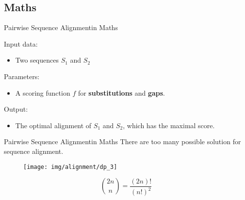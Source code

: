\documentclass[10pt]{beamer}
\newcommand{\1}{
	\setbeamertemplate{background}{
		\texttt{[image: img/1]}
		\tikz[overlay] \fill[fill opacity=0.75,fill=white] (0,0) rectangle (-\paperwidth,\paperheight);
	}
}
\begin{document}
\subsection{Maths}

\begin{frame}{Pairwise Sequence Alignment}{in Maths}		
	\begin{block}{}
	Input data:
			\begin{itemize}
				\item Two sequences $S_1$ and $S_2$
			\end{itemize}
	\end{block}

	\begin{block}{}
		Parameters:
			\begin{itemize}
				\item A scoring function $f$ for \textbf{substitutions} and \textbf{gaps}.
			\end{itemize}
	\end{block}

 	\begin{block}{}
 		Output:
			\begin{itemize}
				\item The optimal alignment of $S_1$ and $S_2$, which has the maximal
				score.
			\end{itemize}
	\end{block}
\end{frame}


\begin{frame}{Pairwise Sequence Alignment}{in Maths}
	There are too many possible solution for sequence alignment.		
	\begin{figure}[]
	\centering
		\texttt{[image: img/alignment/dp\_3]}
		\label{img:uniprot}
	\end{figure}

	\[
		\binom{2n}{n} = \frac{ (2n)! }{(n!)^2}
	\]

\end{frame}
\end{document}
